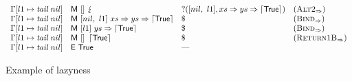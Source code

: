 \begin{figure*}
\[\begin{array}{llll}
      \Gamma[l1\mapsto\textit{tail}~nil] & \textsf{M}~[]~\lightning                                  & ?([nil,~l1],xs \Rightarrow ys \Rightarrow \left\lceil \textsf{True}\right\rceil) & (\textsc{Alt2}_{\Rightarrow})     \\
      \Gamma[l1\mapsto\textit{tail}~nil] & \textsf{M}~[nil,~l1]~xs \Rightarrow ys \Rightarrow \left\lceil \textsf{True}\right\rceil                            & \$                     & (\textsc{Bind}_{\Rightarrow})     \\
      \Gamma[l1\mapsto\textit{tail}~nil] & \textsf{M}~[l1]~ys \Rightarrow \left\lceil \textsf{True}\right\rceil                   & \$                     & (\textsc{Bind}_{\Rightarrow})     \\
      \Gamma[l1\mapsto\textit{tail}~nil] & \textsf{M}~[]~\left\lceil \textsf{True}\right\rceil                                    & \$                     & (\textsc{Return1B}_{\Rightarrow}) \\
      \Gamma[l1\mapsto\textit{tail}~nil] & \textsf{E}~\textsf{True}{}                                          & \text{---}             &                        \\
    \end{array}
  \]
  \caption{Example of lazyness}
  \label{fig:ex-lazy}
\end{figure*}

